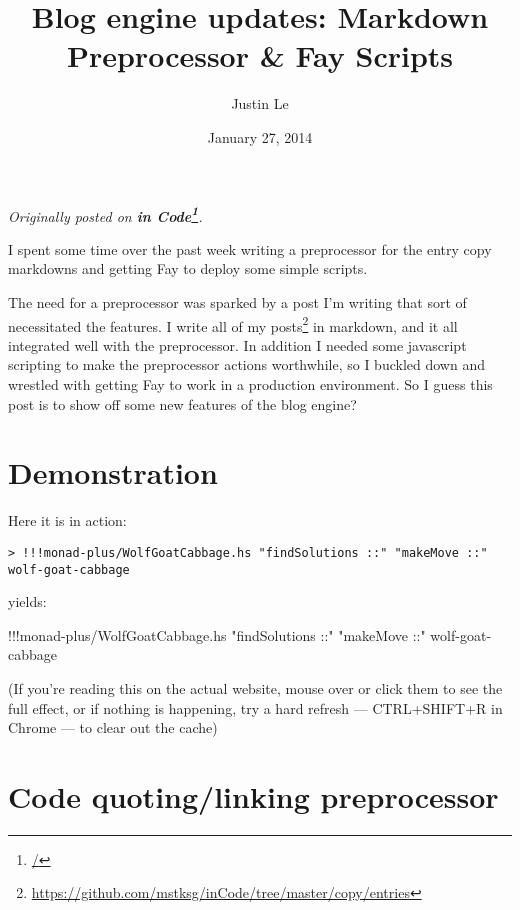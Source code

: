 \documentclass[]{article}
\title{Blog engine updates: Markdown Preprocessor \& Fay Scripts}
\author{Justin Le}
\date{January 27, 2014}
\newenvironment{Shaded}{}{}
\newcommand{\StringTok}[1]{\textcolor[rgb]{0.25,0.44,0.63}{{#1}}}
\newcommand{\FunctionTok}[1]{\textcolor[rgb]{0.02,0.16,0.49}{{#1}}}
\newcommand{\NormalTok}[1]{{#1}}
\renewcommand{\href}[2]{#2\footnote{\url{#1}}}
\begin{document}
\maketitle

\emph{Originally posted on \textbf{\href{/}{in Code}}.}

I spent some time over the past week writing a preprocessor for the
entry copy markdowns and getting Fay to deploy some simple scripts.

The need for a preprocessor was sparked by a post I'm writing that sort
of necessitated the features. I write
\href{https://github.com/mstksg/inCode/tree/master/copy/entries}{all of
my posts} in markdown, and it all integrated well with the preprocessor.
In addition I needed some javascript scripting to make the preprocessor
actions worthwhile, so I buckled down and wrestled with getting Fay to
work in a production environment. So I guess this post is to show off
some new features of the blog engine?

\section{Demonstration}\label{demonstration}

Here it is in action:

\begin{verbatim}
> !!!monad-plus/WolfGoatCabbage.hs "findSolutions ::" "makeMove ::" wolf-goat-cabbage
\end{verbatim}

yields:

\begin{Shaded}
\begin{Highlighting}[]
\FunctionTok{!!!}\NormalTok{monad}\FunctionTok{-}\NormalTok{plus}\FunctionTok{/}\NormalTok{WolfGoatCabbage.hs }\StringTok{"findSolutions ::"} \StringTok{"makeMove ::"} \NormalTok{wolf}\FunctionTok{-}\NormalTok{goat}\FunctionTok{-}\NormalTok{cabbage}
\end{Highlighting}
\end{Shaded}

(If you're reading this on the actual website, mouse over or click them
to see the full effect, or if nothing is happening, try a hard refresh
--- CTRL+SHIFT+R in Chrome --- to clear out the cache)

\section{Code quoting/linking
preprocessor}\label{code-quotinglinking-preprocessor}
\end{document}
